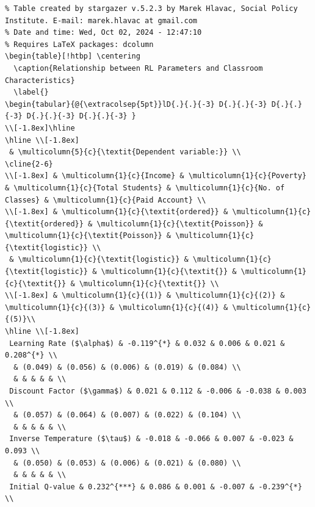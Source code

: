 \documentclass[
  number,
  preprint,
  3p,
  onecolumn]{elsarticle}
\begin{document}
\begin{table}
{\begin{verbatim}
% Table created by stargazer v.5.2.3 by Marek Hlavac, Social Policy Institute. E-mail: marek.hlavac at gmail.com
% Date and time: Wed, Oct 02, 2024 - 12:47:10
% Requires LaTeX packages: dcolumn 
\begin{table}[!htbp] \centering 
  \caption{Relationship between RL Parameters and Classroom Characteristics} 
  \label{} 
\begin{tabular}{@{\extracolsep{5pt}}lD{.}{.}{-3} D{.}{.}{-3} D{.}{.}{-3} D{.}{.}{-3} D{.}{.}{-3} } 
\\[-1.8ex]\hline 
\hline \\[-1.8ex] 
 & \multicolumn{5}{c}{\textit{Dependent variable:}} \\ 
\cline{2-6} 
\\[-1.8ex] & \multicolumn{1}{c}{Income} & \multicolumn{1}{c}{Poverty} & \multicolumn{1}{c}{Total Students} & \multicolumn{1}{c}{No. of Classes} & \multicolumn{1}{c}{Paid Account} \\ 
\\[-1.8ex] & \multicolumn{1}{c}{\textit{ordered}} & \multicolumn{1}{c}{\textit{ordered}} & \multicolumn{1}{c}{\textit{Poisson}} & \multicolumn{1}{c}{\textit{Poisson}} & \multicolumn{1}{c}{\textit{logistic}} \\ 
 & \multicolumn{1}{c}{\textit{logistic}} & \multicolumn{1}{c}{\textit{logistic}} & \multicolumn{1}{c}{\textit{}} & \multicolumn{1}{c}{\textit{}} & \multicolumn{1}{c}{\textit{}} \\ 
\\[-1.8ex] & \multicolumn{1}{c}{(1)} & \multicolumn{1}{c}{(2)} & \multicolumn{1}{c}{(3)} & \multicolumn{1}{c}{(4)} & \multicolumn{1}{c}{(5)}\\ 
\hline \\[-1.8ex] 
 Learning Rate ($\alpha$) & -0.119^{*} & 0.032 & 0.006 & 0.021 & 0.208^{*} \\ 
  & (0.049) & (0.056) & (0.006) & (0.019) & (0.084) \\ 
  & & & & & \\ 
 Discount Factor ($\gamma$) & 0.021 & 0.112 & -0.006 & -0.038 & 0.003 \\ 
  & (0.057) & (0.064) & (0.007) & (0.022) & (0.104) \\ 
  & & & & & \\ 
 Inverse Temperature ($\tau$) & -0.018 & -0.066 & 0.007 & -0.023 & 0.093 \\ 
  & (0.050) & (0.053) & (0.006) & (0.021) & (0.080) \\ 
  & & & & & \\ 
 Initial Q-value & 0.232^{***} & 0.086 & 0.001 & -0.007 & -0.239^{*} \\ 

\end{verbatim}}
\end{table}
\end{document}
